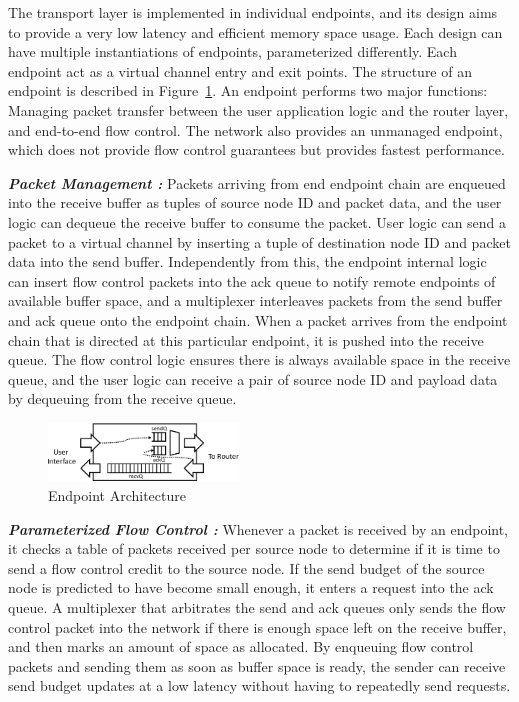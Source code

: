The transport layer is implemented in individual endpoints, and its design aims
to provide a very low latency and efficient memory space usage. Each design can
have multiple instantiations of endpoints, parameterized differently. Each
endpoint act as a virtual channel entry and exit points.
The structure of an endpoint is described in Figure~\ref{fig:endpoint}. An
endpoint performs two major functions: Managing packet transfer between the user
application logic and the router layer, and end-to-end flow control. The network
also provides an unmanaged endpoint, which does not provide flow
control guarantees but provides fastest performance.


\emph{\bf{Packet Management :}}
Packets
arriving from end endpoint chain are enqueued into the receive buffer as tuples
of source node ID and packet data, and the user logic can dequeue the receive
buffer to consume the packet. User logic can send a packet to a virtual channel
by inserting a tuple of destination node ID and packet data into the send
buffer. Independently from this, the endpoint internal logic can insert flow
control packets into the ack queue to notify remote endpoints of available
buffer space, and a multiplexer interleaves packets from the send buffer and ack
queue onto the endpoint chain. When a packet arrives from the endpoint chain
that is directed at this particular endpoint, it is pushed into the receive
queue. The flow control logic ensures there is always available space in the
receive queue, and the user logic can receive a pair of source node ID and
payload data by dequeuing from the receive queue.


\begin{figure}[h]
	\begin{center}
	\includegraphics[width=0.45\textwidth]{resources/endpoint-crop.pdf}
	\caption{Endpoint Architecture}
	\label{fig:endpoint}
	\end{center}
\end{figure}

\emph{\bf{Parameterized Flow Control :}}
Whenever a packet is received by an endpoint, it checks a table of packets
received per source node to determine if it is time to send a flow control
credit to the source node. If the send budget of the source node is predicted to
have become small enough, it enters a request into the ack queue. A
multiplexer that arbitrates the send and ack queues only sends the flow control
packet into the network if there is enough space left on the receive buffer, and
then marks an amount of space as allocated. By enqueuing flow control packets
and sending them as soon as buffer space is ready, the sender can receive send
budget updates at a low latency without having to repeatedly send requests.

